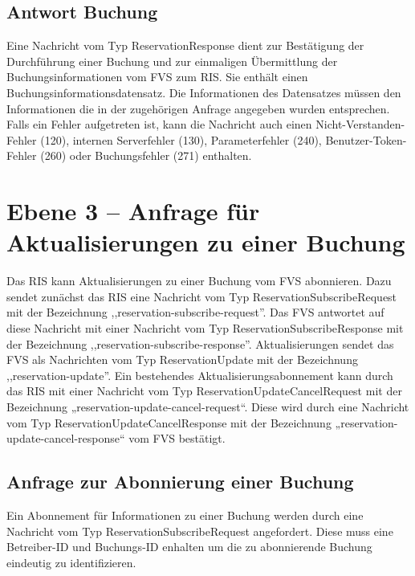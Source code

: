 

\subsection{Antwort Buchung}
Eine Nachricht vom Typ ReservationResponse dient zur Bestätigung der Durchführung einer Buchung und zur einmaligen Übermittlung der Buchungsinformationen vom FVS zum RIS. Sie enthält einen Buchungsinformationsdatensatz. Die Informationen des Datensatzes müssen den Informationen die in der zugehörigen Anfrage angegeben wurden entsprechen. Falls ein Fehler aufgetreten ist, kann die Nachricht auch einen Nicht-Verstanden-Fehler (120), internen Serverfehler (130), Parameterfehler (240), Benutzer-Token-Fehler (260) oder Buchungsfehler (271) enthalten.




\section{Ebene 3 -- Anfrage für Aktualisierungen zu einer Buchung}
Das RIS kann Aktualisierungen zu einer Buchung vom FVS abonnieren. Dazu sendet zunächst das RIS eine Nachricht vom Typ ReservationSubscribeRequest mit der Bezeichnung ,,reservation-subscribe-request''. Das FVS antwortet auf diese Nachricht mit einer Nachricht vom Typ ReservationSubscribeResponse mit der Bezeichnung ,,reservation-subscribe-response''. Aktualisierungen sendet das FVS als Nachrichten vom Typ ReservationUpdate mit der Bezeichnung ,,reservation-update''. Ein bestehendes Aktualisierungsabonnement kann durch das RIS mit einer Nachricht vom Typ ReservationUpdateCancelRequest mit der Bezeichnung „reservation-update-cancel-request“. Diese wird durch eine Nachricht vom Typ ReservationUpdateCancelResponse mit der Bezeichnung „reservation-update-cancel-response“ vom FVS bestätigt.



\subsection{Anfrage zur Abonnierung einer Buchung}
Ein Abonnement für Informationen zu einer Buchung werden durch eine Nachricht vom Typ ReservationSubscribeRequest angefordert. Diese muss eine Betreiber-ID und Buchungs-ID enhalten um die zu abonnierende Buchung eindeutig zu identifizieren.

